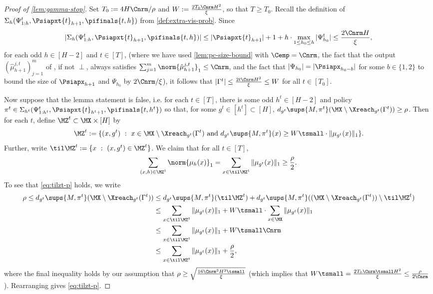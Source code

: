 \documentclass[11pt, oneside]{article}
\theoremstyle{plain}
\theoremstyle{definition}
\numberwithin{theorem}{section}
\renewcommand{\^}[1]{^{(#1)}}
\begin{document}
\begin{proof}[Proof of \cref{lem:gamma-stop}]
  Set $T_0 := 4H\Cnrm/\rho$ and $W := \frac{2T_0 \Cnrm H^2}{\xi}$, so that $T \geq T_0$. Recall the definition of $\Sigma_h(\Psi_{1:h}^t, \Psiapxt{t}_{h+1}, \pifinals{t,h})$ from  \cref{def:extra-vis-prob}. %
  Since
  \begin{align}
| \Sigma_h(\Psi_{1:h}^t, \Psiapxt{t}_{h+1}, \pifinals{t,h})| \leq |\Psiapxt{t}_{h+1}| + 1 + h \cdot \max_{1\leq h_0 \leq h} | \Psi_{h_0}^t| \leq \frac{2\Cnrm H}{\xi}\nonumber,
  \end{align}
  for each odd $h \in [H-2]$ and $t \in [T]$, 
  (where we have used \cref{lem:pc-size-bound} with $\Cemp = \Cnrm$, the fact that the output $(\hat\mu_{h+1}^{j,t})_{j=1}^m$ of \ESCt, if not $\perp$, always satisfies $\sum_{j=1}^m \norm{\hat\mu_{h+1}^{j,t}}_1 \leq \Cnrm$, and the fact that $|\Psi_{h_0}| = |\Psiapx_{h_0-b}|$ for some $b \in \{1,2\}$ to bound the size of $\Psiapx_{h+1}$ and $\Psi_{h_0}$ by $2\Cnrm/\xi$), it follows that $|\Gamma^t| \leq \frac{2t\Cnrm H^2}{\xi} \leq W$ for all $t \in [T_0]$.  
  
  Now suppose that the lemma statement is false, i.e. for each $t \in [T]$, there is some odd $h^t \in [H-2]$ and policy $\pi^t \in \Sigma_{h^t}(\Psi_{1:h^t}^t, \Psiapxt{t}_{h^t+1}, \pifinals{t,h^t})$ so that, for some $g^t \in [h^t] \subset [H]$, $d_{g^t}\sups{M, \pi^t}(\MX \setminus \Xreach_{g^t}(\Gamma^t)) \geq \rho$. Then for each $t$, define $\MZ^t \subset \MX \times [H]$ by 
  \[\MZ^t := \{ (x,g^t) \ : \ x \in \MX \setminus \Xreach_{g^t}(\Gamma^t) \text{ and } d_{g^t}\sups{M, \pi^t}(x) \geq W \tsmall \cdot \| \mu_{g^t}(x) \|_1 \}.\] Further, write $\til \MZ^t := \{ x \ : \ (x,g^t) \in \MZ^t\}$.  We claim that for all $t \in [T]$,
  \begin{align}
  \sum_{(x,h) \in \MZ^t} \norm{\mu_h(x)}_1 = \sum_{x \in \til\MZ^t} \| \mu_{g^t}(x) \|_1 \geq \frac{\rho}{2}.\label{eq:tilzt-p}
  \end{align}
  To see that \cref{eq:tilzt-p} holds, we write
  \begin{align}
   \rho \leq  d_{g^t}\sups{M, \pi^t}(\MX \setminus \Xreach_{g^t}(\Gamma^t)) 
   &\leq  d_{g^t}\sups{M, \pi^t}(\til \MZ^t) + d_{g^t}\sups{M, \pi^t}((\MX\setminus \Xreach_{g^t}(\Gamma^t)) \setminus \til \MZ^t) \nonumber\\
    &\leq \sum_{x \in \til \MZ^t} \| \mu_{g^t}(x) \|_1  + W\tsmall \cdot \sum_{x \in \MX} \| \mu_{g^t}(x) \|_1 \nonumber\\
    &\leq  \sum_{x \in \til \MZ^t} \| \mu_{g^t}(x) \|_1 + W\tsmall \Cnrm \nonumber\\
    &\leq \sum_{x \in \til \MZ^t} \| \mu_{g^t}(x) \|_1 + \frac{\rho}{2}\nonumber,
  \end{align}
  where the final inequality holds by our assumption that $\rho \geq \sqrt{\frac{16\Cnrm^3 H^3 \tsmall}{\xi}}$ (which implies that $W\tsmall = \frac{2T_0\Cnrm\tsmall H^2}{\xi} \leq \frac{\rho}{2\Cnrm}$). Rearranging gives \cref{eq:tilzt-p}. 
  

\end{proof}
\end{document}
